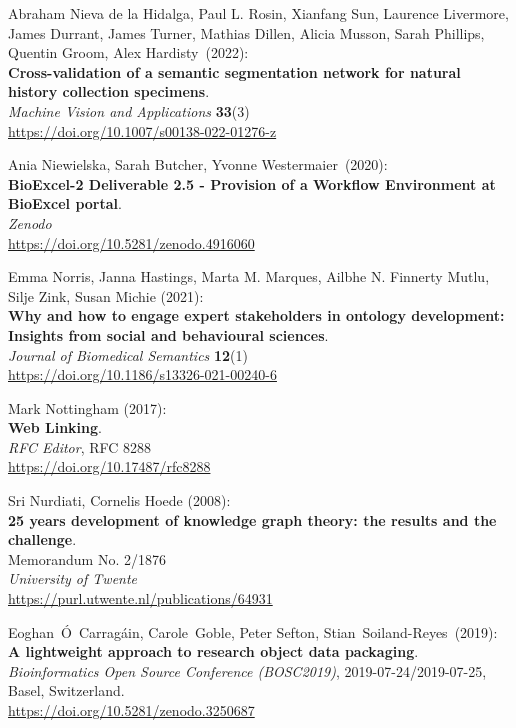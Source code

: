 \begin{thebibliography}{9}
Abraham Nieva de la Hidalga, Paul L. Rosin, Xianfang Sun, Laurence Livermore, James Durrant, James Turner, Mathias Dillen, Alicia Musson, Sarah Phillips, Quentin Groom, Alex Hardisty~(2022):\\
\textbf{Cross-validation of a semantic segmentation network for natural history collection specimens}.\\
\emph{Machine Vision and Applications} \textbf{33}(3)\\
\url{https://doi.org/10.1007/s00138-022-01276-z}

Ania Niewielska, Sarah Butcher, Yvonne Westermaier~(2020):\\
\textbf{BioExcel-2 Deliverable 2.5 - Provision of a Workflow Environment
at BioExcel portal}.\\
\emph{Zenodo}\\
\url{https://doi.org/10.5281/zenodo.4916060}

Emma Norris, Janna Hastings, Marta M. Marques, Ailbhe N. Finnerty Mutlu,
Silje Zink, Susan Michie (2021): \\
\textbf{Why and how to engage expert
stakeholders in ontology development: Insights from social and
behavioural sciences}. \\
\emph{Journal of Biomedical Semantics} \textbf{12}(1) \\
\url{https://doi.org/10.1186/s13326-021-00240-6}

Mark Nottingham (2017): \\
\textbf{Web {Linking}}.\\
\emph{RFC Editor}, RFC 8288\\
\url{https://doi.org/10.17487/rfc8288}

Sri Nurdiati, Cornelis Hoede (2008):\\
\textbf{25 years development of knowledge graph theory: the results and the challenge}.\\
Memorandum No. 2/1876\\
\emph{University of Twente}\\
\url{https://purl.utwente.nl/publications/64931}

Eoghan~Ó~Carragáin, Carole~Goble, Peter Sefton,
Stian~Soiland-Reyes~(2019):\\
\textbf{A lightweight approach to research object data packaging}.\\
\emph{Bioinformatics Open Source Conference (BOSC2019)},
2019-07-24/2019-07-25, Basel, Switzerland.\\
\url{https://doi.org/10.5281/zenodo.3250687}


\end{thebibliography}

